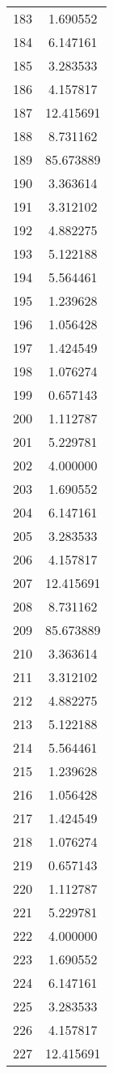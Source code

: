 \documentclass[12pt]{article}
\begin{document}
\begin{longtable}{@{}cc@{}}
183 & 1.690552 \\
184 & 6.147161 \\
185 & 3.283533 \\
186 & 4.157817 \\
187 & 12.415691 \\
188 & 8.731162 \\
189 & 85.673889 \\
190 & 3.363614 \\
191 & 3.312102 \\
192 & 4.882275 \\
193 & 5.122188 \\
194 & 5.564461 \\
195 & 1.239628 \\
196 & 1.056428 \\
197 & 1.424549 \\
198 & 1.076274 \\
199 & 0.657143 \\
200 & 1.112787 \\
201 & 5.229781 \\
202 & 4.000000 \\
203 & 1.690552 \\
204 & 6.147161 \\
205 & 3.283533 \\
206 & 4.157817 \\
207 & 12.415691 \\
208 & 8.731162 \\
209 & 85.673889 \\
210 & 3.363614 \\
211 & 3.312102 \\
212 & 4.882275 \\
213 & 5.122188 \\
214 & 5.564461 \\
215 & 1.239628 \\
216 & 1.056428 \\
217 & 1.424549 \\
218 & 1.076274 \\
219 & 0.657143 \\
220 & 1.112787 \\
221 & 5.229781 \\
222 & 4.000000 \\
223 & 1.690552 \\
224 & 6.147161 \\
225 & 3.283533 \\
226 & 4.157817 \\
227 & 12.415691 \\

\end{longtable}
\end{document}
